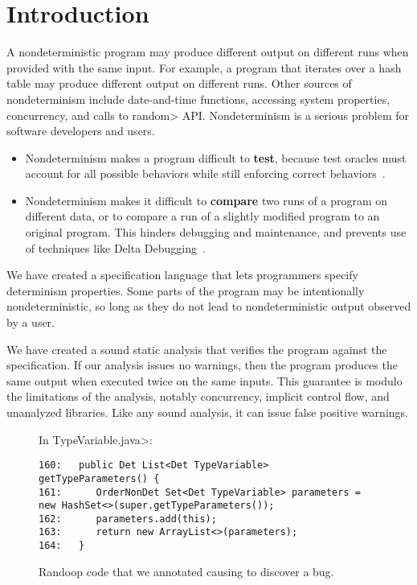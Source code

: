 \section{Introduction\label{sec:introduction}}

A nondeterministic program may produce different output on different runs
when provided with the same input.
For example, a program that iterates over a hash table
may produce different output on different runs.
Other sources of nondeterminism include
date-and-time functions,
accessing system properties,
concurrency,
and calls to \<random> API.
%
Nondeterminism is a serious problem for software developers and users.
\begin{itemize}
\item
  Nondeterminism makes a program difficult to \textbf{test}, because test
  oracles must account for all possible behaviors while still enforcing
  correct behaviors~\cite{LuoHEM2014,ShiGLM2016,BellLHEYM2018,Sudarshan}.
\item
  Nondeterminism makes it difficult to \textbf{compare} two runs of a
  program on different data, or to compare a run of a slightly modified
  program to an original program.  This hinders debugging and maintenance,
  and prevents use of techniques like Delta Debugging~\cite{Zeller1999,YuLCZ2012}.
\end{itemize}


We have created a specification language that lets programmers specify
determinism properties.
Some parts of the program may be intentionally nondeterministic, so long
as they do not lead to nondeterministic output observed by a user.  

We have created a sound static analysis that verifies the program against the specification.
If our analysis issues no warnings, then the program produces the same
output when executed twice on the same inputs.  This guarantee is modulo
the limitations of the
analysis, notably 
concurrency, implicit control flow, and unanalyzed libraries.
Like any
sound analysis, it can issue false positive warnings.

\begin{figure*}

\noindent
In \<TypeVariable.java>:

\begin{Verbatim}
160:   public Det List<Det TypeVariable> getTypeParameters() {
161:      OrderNonDet Set<Det TypeVariable> parameters = new HashSet<>(super.getTypeParameters());
162:      parameters.add(this);
163:      return new ArrayList<>(parameters);
164:   }
\end{Verbatim}

\caption{Randoop code that we annotated causing \theDeterminismChecker to discover a bug.}
\label{fig:randoop-bug-hashset}
\vspace{-0.4cm}
\end{figure*}


